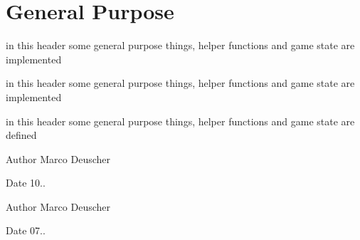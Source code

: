 \hypertarget{group__genPurpose}{}\section{General Purpose}
\label{group__genPurpose}


in this header some general purpose things, helper functions and game state are implemented  


in this header some general purpose things, helper functions and game state are implemented 

in this header some general purpose things, helper functions and game state are defined

\begin{DoxyAuthor}{Author}
Marco Deuscher 
\end{DoxyAuthor}
\begin{DoxyDate}{Date}
10..
\end{DoxyDate}
\begin{DoxyAuthor}{Author}
Marco Deuscher 
\end{DoxyAuthor}
\begin{DoxyDate}{Date}
07.. 
\end{DoxyDate}

